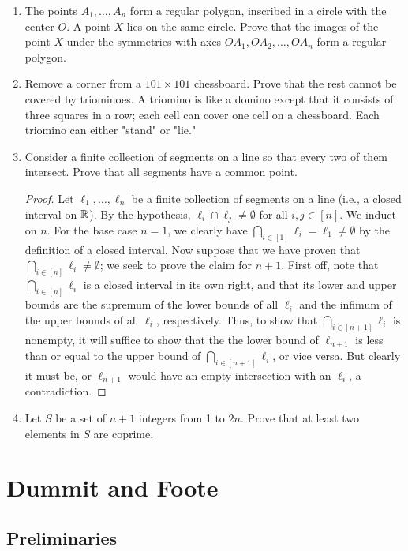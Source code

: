 \documentclass[../main.tex]{subfiles}
\begin{document}
\begin{enumerate}
\begin{proof}
    \end{proof}
    \item The points $A_1,\dots,A_n$ form a regular polygon, inscribed in a circle with the center $O$. A point $X$ lies on the same circle. Prove that the images of the point $X$ under the symmetries with axes $OA_1,OA_2,\dots,OA_n$ form a regular polygon.
    \item Remove a corner from a $101\times 101$ chessboard. Prove that the rest cannot be covered by triominoes. A triomino is like a domino except that it consists of three squares in a row; each cell can cover one cell on a chessboard. Each triomino can either "stand" or "lie."
    \item Consider a finite collection of segments on a line so that every two of them intersect. Prove that all segments have a common point.
    \begin{proof}
        Let $\ell_1,\dots,\ell_n$ be a finite collection of segments on a line (i.e., a closed interval on $\mathbb{R}$). By the hypothesis, $\ell_i\cap\ell_j\neq\emptyset$ for all $i,j\in[n]$. We induct on $n$. For the base case $n=1$, we clearly have $\bigcap_{i\in[1]}\ell_i=\ell_1\neq\emptyset$ by the definition of a closed interval. Now suppose that we have proven that $\bigcap_{i\in[n]}\ell_i\neq\emptyset$; we seek to prove the claim for $n+1$. First off, note that $\bigcap_{i\in[n]}\ell_i$ is a closed interval in its own right, and that its lower and upper bounds are the supremum of the lower bounds of all $\ell_i$ and the infimum of the upper bounds of all $\ell_i$, respectively. Thus, to show that $\bigcap_{i\in[n+1]}\ell_i$ is nonempty, it will suffice to show that the the lower bound of $\ell_{n+1}$ is less than or equal to the upper bound of $\bigcap_{i\in[n+1]}\ell_i$, or vice versa. But clearly it must be, or $\ell_{n+1}$ would have an empty intersection with an $\ell_i$, a contradiction.
    \end{proof}
    \item Let $S$ be a set of $n+1$ integers from 1 to $2n$. Prove that at least two elements in $S$ are coprime.
\end{enumerate}



\section{Dummit and Foote}
\setcounter{subsection}{-1}
\subsection{Preliminaries}
\end{document}
